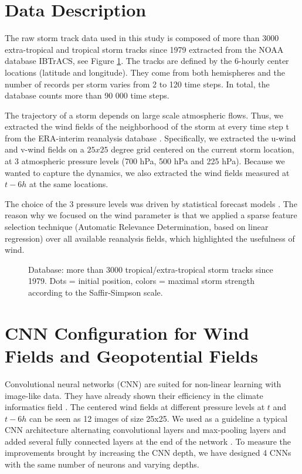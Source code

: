 \section{Data Description}
The raw storm track data used in this study is composed of more than 3000 extra-tropical and tropical storm tracks since 1979 extracted from the NOAA database IBTrACS\cite{knapp2010international}, see Figure \ref{fig:storm_tracks}. The tracks are defined by the 6-hourly center locations (latitude and longitude). They come from both hemispheres and the number of records per storm varies from 2 to 120 time steps. In total, the database counts more than 90 000 time steps. 

The trajectory of a storm depends on large scale atmospheric flows. Thus, we extracted the wind fields of the neighborhood of the storm at every time step t from the ERA-interim reanalysis database \cite{dee2011era}. Specifically, we extracted the u-wind and v-wind fields on a $25x25$ degree grid centered on the current storm location, at 3 atmospheric pressure levels (700 hPa, 500 hPa and 225 hPa). Because we wanted to capture the dynamics, we also extracted the wind fields measured at $t - 6h$ at the same locations.

The choice of the 3 pressure levels was driven by statistical forecast models \cite{demaria2005further}. The reason why we focused on the wind parameter is that we applied a sparse feature selection technique (Automatic Relevance Determination, based on linear regression) over all available reanalysis fields, which highlighted the usefulness of wind.

\begin{figure}
	\begin{center}
		\hsize {}
	\end{center}
	\caption{Database: more than 3000 tropical/extra-tropical storm
 	tracks since 1979. Dots = initial position, colors = maximal storm strength according to the Saffir-Simpson scale.}
	\label{fig:storm_tracks}
\end{figure}


\section{CNN Configuration for Wind Fields and Geopotential Fields}
Convolutional neural networks (CNN) are suited for non-linear learning with image-like data. They have already shown their efficiency in the climate informatics field \cite{xingjian2015convolutional, de2017deep,racah2017extremeweather}. The centered wind fields at different pressure levels at $t$ and $t-6h$ can be seen as 12 images of size 25x25. We used as a guideline a typical CNN architecture alternating convolutional layers and max-pooling layers and added several fully connected layers at the end of the network \cite{simonyan2014very}. To measure the improvements brought by increasing the CNN depth, we have designed 4 CNNs with the same number of neurons and varying depths. 


